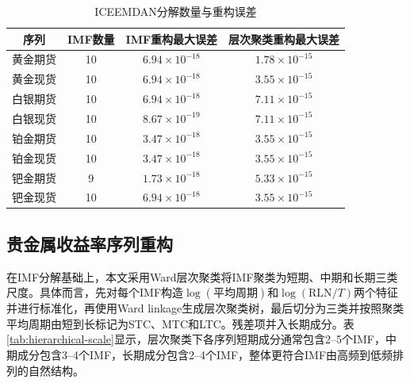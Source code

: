\documentclass[UTF8,zihao=-4,fontset=fandol]{ctexart}
\newenvironment{normaltable}{%
  \begin{center}\songti\zihao{5}\setlength{\baselineskip}{12pt}\selectfont\renewcommand{\arraystretch}{1.0}%
}{\end{center}}
\begin{document}
\begin{table}[H]
\caption{ICEEMDAN分解数量与重构误差}
\label{tab:iceemdan-error}
\begin{normaltable}
\begin{tabular}{cccc}
\toprule
序列 & IMF数量 & IMF重构最大误差 & 层次聚类重构最大误差 \\
\midrule
黄金期货 & 10 & $6.94\times10^{-18}$ & $1.78\times10^{-15}$ \\
黄金现货 & 10 & $6.94\times10^{-18}$ & $3.55\times10^{-15}$ \\
白银期货 & 10 & $6.94\times10^{-18}$ & $7.11\times10^{-15}$ \\
白银现货 & 10 & $8.67\times10^{-19}$ & $7.11\times10^{-15}$ \\
铂金期货 & 10 & $3.47\times10^{-18}$ & $3.55\times10^{-15}$ \\
铂金现货 & 10 & $3.47\times10^{-18}$ & $3.55\times10^{-15}$ \\
钯金期货 & 9 & $1.73\times10^{-18}$ & $5.33\times10^{-15}$ \\
钯金现货 & 10 & $6.94\times10^{-18}$ & $3.55\times10^{-15}$ \\
\bottomrule
\end{tabular}
\end{normaltable}
\end{table}

\subsection{贵金属收益率序列重构}
在IMF分解基础上，本文采用Ward层次聚类将IMF聚类为短期、中期和长期三类尺度。具体而言，先对每个IMF构造$\log(\text{平均周期})$和$\log(\text{RLN}/T)$两个特征并进行标准化，再使用Ward linkage生成层次聚类树，最后切分为三类并按照聚类平均周期由短到长标记为STC、MTC和LTC。残差项并入长期成分。表\ref{tab:hierarchical-scale}显示，层次聚类下各序列短期成分通常包含2--5个IMF，中期成分包含3--4个IMF，长期成分包含2--4个IMF，整体更符合IMF由高频到低频排列的自然结构。
\end{document}
